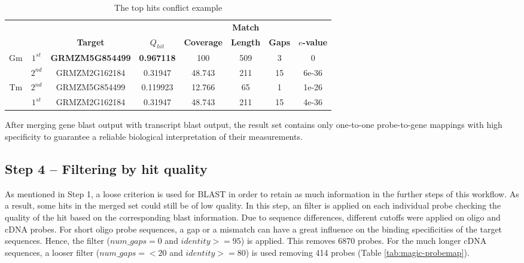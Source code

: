 \begin{table}
	\centering
	\begin{footnotesize}
	\caption{The top hits conflict example} 
	\label{tab:magic-conflict-tops}
	\begin{tabular}{@{}cc|cccccc@{}}
	\toprule
	& & & & & \textbf{Match} & & \\
	& & \textbf{Target} & \textbf{$Q_{hit}$} & \textbf{Coverage} & 
	\textbf{Length} & \textbf{Gaps} & \textbf{$e$-value} \\ 
	\midrule
	Gm &
	$1^{st}$ & \textbf{GRMZM5G854499} & \textbf{0.967118} & 100 & 509 & 3 & 0 \\
	& $2^{nd}$ & GRMZM2G162184 & 0.31947 & 48.743 & 211 & 15 & 6e-36 \\
	\hline
	Tm & 
	$2^{nd}$ & GRMZM5G854499 & 0.119923 & 12.766 & 65 & 1 & 1e-26 \\
	& $1^{st}$ & GRMZM2G162184 & 0.31947 & 48.743 & 211 & 15 & 4e-36 \\
	\bottomrule
	\end{tabular}
	\end{footnotesize}
\end{table}

After merging gene blast output with transcript blast output, the result set 
contains only one-to-one probe-to-gene mappings with high specificity to 
guarantee a reliable biological interpretation of their measurements. 



\subsection{Step 4 – Filtering by hit quality}


As mentioned in Step 1, a loose criterion is used for BLAST in order to retain 
as much information in the further steps of this workflow. 
As a result, some hits in the merged set could still be of low quality. 
In this step, an filter is applied on each individual probe checking the 
quality of the hit based on the corresponding blast information.
Due to sequence differences, different cutoffs were applied on oligo and cDNA 
probes. 
For short oligo probe sequences, a gap or a mismatch can have a great influence 
on the binding specificities of the target sequences. 
Hence, the filter ($num\_gaps = 0$ and $identity >= 95$) is applied. This 
removes 6870 probes. 
For the much longer cDNA sequences, a looser filter ($num\_gaps =< 20$ and 
$identity >= 80$) is used removing 414 probes (Table 
\ref{tab:magic-probemap}). 


